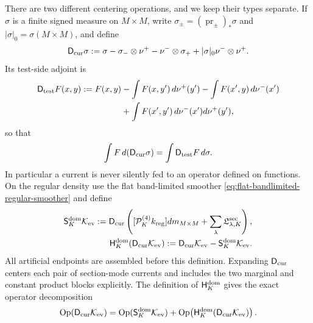 \documentclass[11pt]{article}
\begin{document}
There are two different centering operations, and we keep their types
separate.  If $\sigma$ is a finite signed measure on $M\times M$, write
$\sigma_\pm=(\operatorname{pr}_\pm)_*\sigma$ and
$|\sigma|_0=\sigma(M\times M)$, and define
\begin{equation}
\label{eq:current-centering}
 \mathsf D_{\rm cur}\sigma
 :=\sigma-\sigma_-\otimes\nu^+-\nu^-\otimes\sigma_+
       +|\sigma|_0\nu^-\otimes\nu^+.
\end{equation}
Its test-side adjoint is
\begin{align}
 \mathsf D_{\rm test}F(x,y)
 :=F(x,y)&-\int F(x,y')\,d\nu^+(y')
          -\int F(x',y)\,d\nu^-(x') \notag\\
 &+\int F(x',y')\,d\nu^-(x')d\nu^+(y'),
 \label{eq:test-centering}
\end{align}
so that
\begin{equation}
 \label{eq:centering-adjoint-identity}
 \int F\,d(\mathsf D_{\rm cur}\sigma)
 =\int \mathsf D_{\rm test}F\,d\sigma.
\end{equation}
In particular a current is never silently fed to an operator defined on
functions.  On the regular density use the flat band-limited smoother
\eqref{eq:flat-bandlimited-regular-smoother} and define
\begin{align}
\label{eq:dominant-centered-smoother}
\mathsf S_K^{\rm dom}\mathcal K_{\rm ev}:=
 \mathsf D_{\rm cur}\left(
 [\mathcal P_K^{(4)}k_{\rm reg}]dm_{M\times M}
 +\sum_\lambda\mathfrak L^{\rm sec}_{\lambda,K}\right),
 \notag\\
 \mathsf H_K^{\rm dom}(\mathsf D_{\rm cur}\mathcal K_{\rm ev}):=
 \mathsf D_{\rm cur}\mathcal K_{\rm ev}-
 \mathsf S_K^{\rm dom}\mathcal K_{\rm ev}.
\end{align}
All artificial endpoints are assembled before this definition.  Expanding
$\mathsf D_{\rm cur}$ centers each pair of section-mode currents and includes
the two marginal and constant product blocks explicitly.
The definition of $\mathsf H_K^{\rm dom}$ gives the exact operator decomposition
\begin{equation}
\label{eq:current-operator-low-high-identity}
 \operatorname{Op}(\mathsf D_{\rm cur}\mathcal K_{\rm ev})
 =\operatorname{Op}(\mathsf S_K^{\rm dom}\mathcal K_{\rm ev})
  +\operatorname{Op}\!\left(
       \mathsf H_K^{\rm dom}(\mathsf D_{\rm cur}\mathcal K_{\rm ev})\right).
\end{equation}
\end{document}
